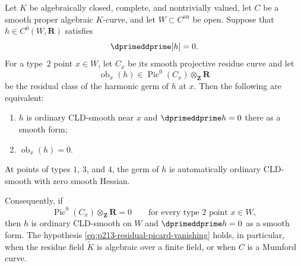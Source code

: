 \begin{proposition}
\label{prop:p213-residual-picard-smooth-curve}
Let \(K\) be algebraically closed, complete, and nontrivially valued, let
\(C\) be a smooth proper algebraic \(K\)-curve, and let
\(W\subset C^{\mathrm{an}}\) be open.  Suppose that
\(h\in C^0(W,\mathbf R)\) satisfies
\[
                         \dprimeddprime[h]=0.
\]
For a type~\(2\) point \(x\in W\), let \(C_x\) be its smooth projective
residue curve and let
\[
 \operatorname{ob}_x(h)\in
 \operatorname{Pic}^0(C_x)\otimes_{\mathbf Z}\mathbf R
\]
be the residual class of the harmonic germ of \(h\) at \(x\).  Then the
following are equivalent:
\begin{enumerate}
\item \(h\) is ordinary CLD-smooth near \(x\) and
      \(\dprimeddprime h=0\) there as a smooth form;
\item \(\operatorname{ob}_x(h)=0\).
\end{enumerate}
At points of types \(1\), \(3\), and \(4\), the germ of \(h\) is
automatically ordinary CLD-smooth with zero smooth Hessian.

Consequently, if
\begin{equation}
\label{eq:p213-residual-picard-vanishing}
       \operatorname{Pic}^0(C_x)\otimes_{\mathbf Z}\mathbf R=0
       \qquad\text{for every type~\(2\) point }x\in W,
\end{equation}
then \(h\) is ordinary CLD-smooth on \(W\) and
\(\dprimeddprime h=0\) as a smooth form.  The hypothesis
\eqref{eq:p213-residual-picard-vanishing} holds, in particular, when the
residue field \(\widetilde K\) is algebraic over a finite field, or when
\(C\) is a Mumford curve.
\end{proposition}
